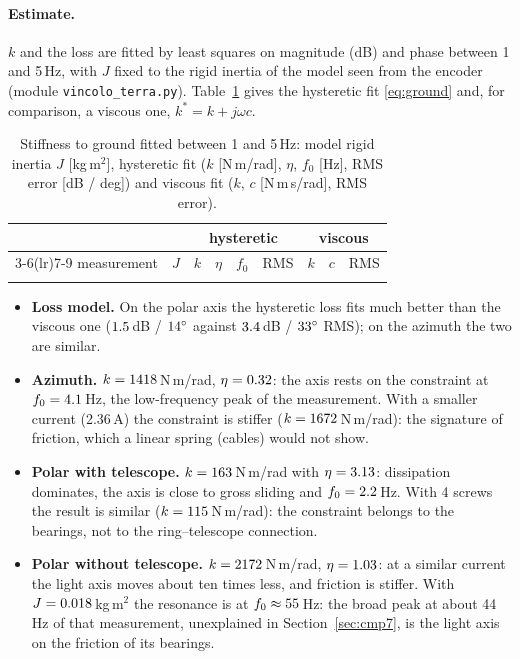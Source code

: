 \documentclass[10pt,a4paper]{article}
\numberwithin{equation}{section}
\begin{document}
\paragraph{Estimate.} $k$ and the loss are fitted by least squares on magnitude (dB) and phase between 1 and 5\,Hz, with $J$ fixed to the rigid inertia of the model seen from the encoder (module \texttt{vincolo\_terra.py}). Table~\ref{tab:ground} gives the hysteretic fit \eqref{eq:ground} and, for comparison, a viscous one, $k^{*} = k + j\omega c$.
\begin{table}[H]\centering\small\setlength{\tabcolsep}{4pt}
\caption{Stiffness to ground fitted between 1 and 5\,Hz: model rigid inertia $J$ [kg\,m$^2$], hysteretic fit ($k$ [N\,m/rad], $\eta$, $f_0$ [Hz], RMS error [dB / deg]) and viscous fit ($k$, $c$ [N\,m\,s/rad], RMS error).}\label{tab:ground}
\begin{tabular}{lrrrrrrrr}\toprule
& & \multicolumn{4}{c}{hysteretic} & \multicolumn{3}{c}{viscous} \\ \cmidrule(lr){3-6}\cmidrule(lr){7-9}
measurement & $J$ & $k$ & $\eta$ & $f_0$ & RMS & $k$ & $c$ & RMS \\ \midrule
\\ \bottomrule
\end{tabular}\end{table}
\begin{itemize}
\item \textbf{Loss model.} On the polar axis the hysteretic loss fits much better than the viscous one ($1.5$\,dB / $14^\circ$ against $3.4$\,dB / $33^\circ$ RMS); on the azimuth the two are similar.
\item \textbf{Azimuth.} $k = 1418$\,N\,m/rad, $\eta = 0.32$: the axis rests on the constraint at $f_0 = 4.1$\,Hz, the low-frequency peak of the measurement. With a smaller current (2.36\,A) the constraint is stiffer ($k = 1672$\,N\,m/rad): the signature of friction, which a linear spring (cables) would not show.
\item \textbf{Polar with telescope.} $k = 163$\,N\,m/rad with $\eta = 3.13$: dissipation dominates, the axis is close to gross sliding and $f_0 = 2.2$\,Hz. With 4 screws the result is similar ($k = 115$\,N\,m/rad): the constraint belongs to the bearings, not to the ring--telescope connection.
\item \textbf{Polar without telescope.} $k = 2172$\,N\,m/rad, $\eta = 1.03$: at a similar current the light axis moves about ten times less, and friction is stiffer. With $J = 0.018$\,kg\,m$^2$ the resonance is at $f_0 \approx 55$\,Hz: the broad peak at about 44\,Hz of that measurement, unexplained in Section~\ref{sec:cmp7}, is the light axis on the friction of its bearings.
\end{itemize}
\end{document}
